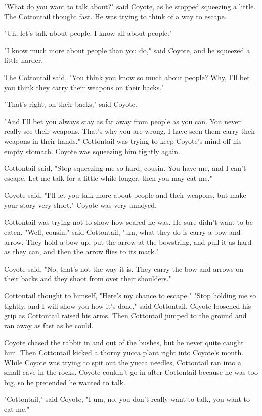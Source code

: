 "What do you want to talk about?" said Coyote, as he stopped squeezing a little. The Cottontail thought fast. He was trying to think of a way to escape.

"Uh, let's talk about people. I know all about people."

"I know much more about people than you do," said Coyote, and he squeezed a little harder.

The Cottontail said, "You think you know so much about people? Why, I'll bet you think they carry their weapons on their backs."

"That's right, on their backs," said Coyote.

"And I'll bet you always stay as far away from people as you can. You never really see their weapons. That's why you are wrong. I have seen them carry their weapons in their hands." Cottontail was trying to keep Coyote's mind off his empty stomach. Coyote was squeezing him tightly again.

Cottontail said, "Stop squeezing me so hard, cousin. You have me, and I can't escape. Let me talk for a little while longer, then you may eat me."

Coyote said, "I'll let you talk more about people and their weapons, but make your story very short." Coyote was very annoyed.

Cottontail was trying not to show how scared he was. He sure didn't want to be eaten. "Well, cousin," said Cottontail, "um, what they do is carry a bow and arrow. They hold a bow up, put the arrow at the bowstring, and pull it as hard as they can, and then the arrow flies to its mark."

Coyote said, "No, that's not the way it is. They carry the bow and arrows on their backs and they shoot from over their shoulders."

Cottontail thought to himself, "Here's my chance to escape." "Stop holding me so tightly, and I will show you how it's done," said Cottontail. Coyote loosened his grip as Cottontail raised his arms. Then Cottontail jumped to the ground and ran away as fast as he could.

Coyote chased the rabbit in and out of the bushes, but he never quite caught him. Then Cottontail kicked a thorny yucca plant right into Coyote's mouth. While Coyote was trying to spit out the yucca needles, Cottontail ran into a small cave in the rocks. Coyote couldn't go in after Cottontail because he was too big, so he pretended he wanted to talk.

"Cottontail," said Coyote, "I um, no, you don't really want to talk, you want to eat me."

